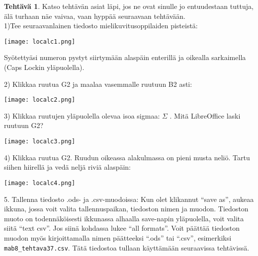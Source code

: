\documentclass[12pt,leqno,a4paper,oneside]{amsart}
\theoremstyle{definition}
\newtheorem{exercise}{Tehtävä}
\theoremstyle{remark}
\numberwithin{equation}{section}
\begin{document}
\begin{exercise}
\label{loex1}
 Katso tehtävän asiat läpi, jos ne ovat sinulle jo entuudestaan tuttuja, älä turhaan näe vaivaa, vaan hyppää seuraavaan tehtävään.\\
 1)Tee seuraavanlainen tiedosto mielikuvitusoppilaiden pisteistä:
 
 \texttt{[image: localc1.png]}
 
 Syötettyäsi numeron pystyt siirtymään alaspäin enterillä ja oikealla sarkaimella (Caps Lockin yläpuolella). 
 
 2) Klikkaa ruutua G2 ja maalaa vasemmalle ruutuun B2 asti:
 
 \texttt{[image: localc2.png]}
 
 3) Klikkaa ruutujen yläpuolella olevaa isoa sigmaa: $\Sigma$ . Mitä LibreOffice laski ruutuun G2?
 
 \texttt{[image: localc3.png]}
 
 4) Klikkaa ruutua G2. Ruudun oikeassa alakulmassa on pieni musta neliö. Tartu siihen hiirellä ja vedä neljä riviä alaspäin:
 
 \texttt{[image: localc4.png]}
 
 5. Tallenna tiedosto .ods- ja .csv-muodoissa: Kun olet klikannut ``save as'', aukeaa ikkuna, jossa voit valita tallennuspaikan, tiedoston nimen ja muodon.
 Tiedoston muoto on todennäköisesti ikkunassa alhaalla save-napin yläpuolella, voit valita siitä ``text csv''. Jos siinä kohdassa lukee ``all formats''.
 Voit päättää tiedoston muodon myös kirjoittamalla nimen päätteeksi ``.ods'' tai ``.csv'', esimerkiksi \texttt{mab8\_tehtava37.csv}.  
 Tätä tiedostoa tullaan käyttämään seuraavissa tehtävissä.
\end{exercise}
\end{document}
